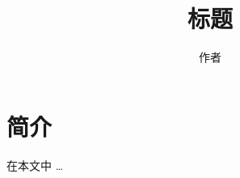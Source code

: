 \documentclass{article}
\title{标题}\author{作者}
\begin{document}
\maketitle

\section{简介}
在本文中 \ldots
\end{document}
